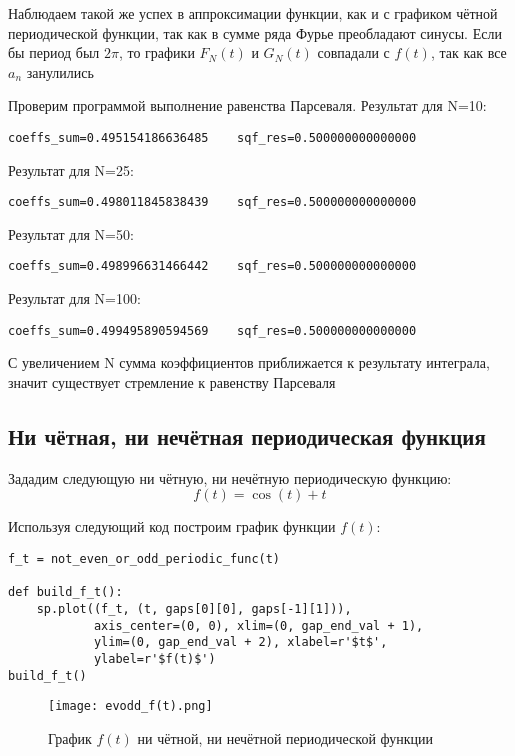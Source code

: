\documentclass[a4paper, 16pt]{article}
\begin{document}
\noindent Наблюдаем такой же успех в аппроксимации функции, как и с графиком чётной периодической функции,
так как в сумме ряда Фурье преобладают синусы. Если бы период был $2\pi$, то графики $F_N(t)$ и $G_N(t)$
совпадали с $f(t)$, так как все $a_n$ занулились


\newpage
\noindent Проверим программой выполнение равенства Парсеваля. Результат для N=10:
\begin{lstlisting}
coeffs_sum=0.495154186636485    sqf_res=0.500000000000000
\end{lstlisting}


\noindent Результат для N=25:
\begin{lstlisting}
coeffs_sum=0.498011845838439    sqf_res=0.500000000000000
\end{lstlisting}


\noindent Результат для N=50:
\begin{lstlisting}
coeffs_sum=0.498996631466442    sqf_res=0.500000000000000
\end{lstlisting}


\noindent Результат для N=100:
\begin{lstlisting}
coeffs_sum=0.499495890594569    sqf_res=0.500000000000000
\end{lstlisting}


\noindent С увеличением N сумма коэффициентов приближается к результату интеграла, значит
существует стремление к равенству Парсеваля


\subsection{Ни чётная, ни нечётная периодическая функция}
\noindent Зададим следующую ни чётную, ни нечётную периодическую функцию:
$$f(t)=\cos{(t)}+t$$


\noindent Используя следующий код построим график функции $f(t)$:
\begin{lstlisting}[belowskip=-3mm]
f_t = not_even_or_odd_periodic_func(t)

def build_f_t():
    sp.plot((f_t, (t, gaps[0][0], gaps[-1][1])), 
            axis_center=(0, 0), xlim=(0, gap_end_val + 1), 
            ylim=(0, gap_end_val + 2), xlabel=r'$t$', 
            ylabel=r'$f(t)$')
build_f_t()
\end{lstlisting}
\begin{figure}[!htb]
    \centering
    \texttt{[image: evodd\_f(t).png]}
    \captionsetup{skip=0pt}
    \caption{График $f(t)$ ни чётной, ни нечётной периодической функции}
    \label{Рис:29}
\end{figure}
\end{document}
